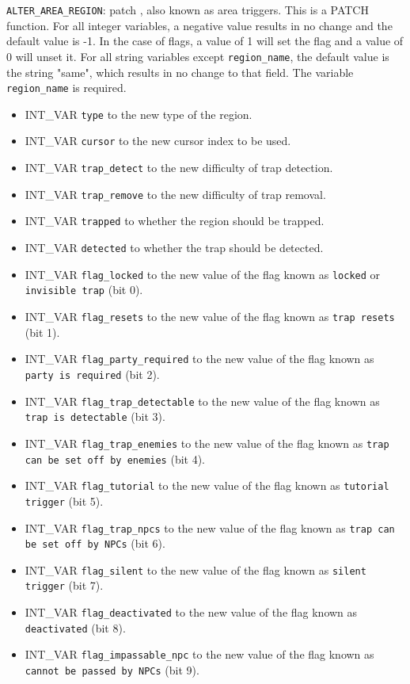 \documentclass{article}
\def\t#1{{\tt #1}}
\begin{document}
\verb+ALTER_AREA_REGION+: patch , also known as area triggers.
This is a PATCH function. For all integer variables, a negative value results in no change and the default value is -1. In the case of flags, a value of 1 will set the flag and a value of 0 will unset it. For all string variables except \verb+region_name+, the default value is the string "same", which results in no change to that field. The variable \verb+region_name+ is required.
\begin{itemize}
\item INT_VAR \verb+type+ to the new type of the region.
\item INT_VAR \verb+cursor+ to the new cursor index to be used.
\item INT_VAR \verb+trap_detect+ to the new difficulty of trap detection.
\item INT_VAR \verb+trap_remove+ to the new difficulty of trap removal.
\item INT_VAR \verb+trapped+ to whether the region should be trapped.
\item INT_VAR \verb+detected+ to whether the trap should be detected.
\item INT_VAR \verb+flag_locked+ to the new value of the flag known as \t{locked} or \t{invisible trap} (bit 0).
\item INT_VAR \verb+flag_resets+ to the new value of the flag known as \t{trap resets} (bit 1).
\item INT_VAR \verb+flag_party_required+ to the new value of the flag known as \t{party is required} (bit 2).
\item INT_VAR \verb+flag_trap_detectable+ to the new value of the flag known as \t{trap is detectable} (bit 3).
\item INT_VAR \verb+flag_trap_enemies+ to the new value of the flag known as \t{trap can be set off by enemies} (bit 4).
\item INT_VAR \verb+flag_tutorial+ to the new value of the flag known as \t{tutorial trigger} (bit 5).
\item INT_VAR \verb+flag_trap_npcs+ to the new value of the flag known as \t{trap can be set off by NPCs} (bit 6).
\item INT_VAR \verb+flag_silent+ to the new value of the flag known as \t{silent trigger} (bit 7).
\item INT_VAR \verb+flag_deactivated+ to the new value of the flag known as \t{deactivated} (bit 8).
\item INT_VAR \verb+flag_impassable_npc+ to the new value of the flag known as \t{cannot be passed by NPCs} (bit 9).

\end{itemize}
\end{document}
